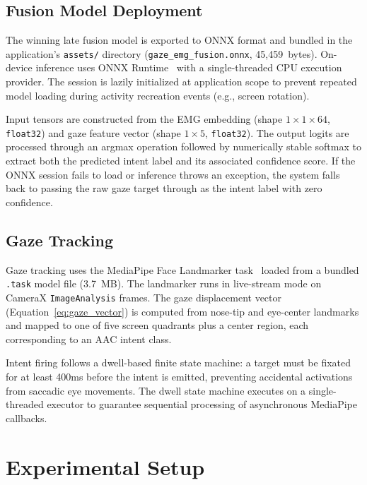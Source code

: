 \documentclass[journal]{IEEEtran}
\begin{document}
\subsection{Fusion Model Deployment}
\label{sec:fusion_deploy}

The winning late fusion model is exported to ONNX format and bundled in the application's \texttt{assets/} directory (\texttt{gaze\_emg\_fusion.onnx}, 45,459~bytes). On-device inference uses ONNX Runtime~\cite{onnxruntime} with a single-threaded CPU execution provider. The session is lazily initialized at application scope to prevent repeated model loading during activity recreation events (e.g., screen rotation).

Input tensors are constructed from the EMG embedding (shape $1 \times 1 \times 64$, \texttt{float32}) and gaze feature vector (shape $1 \times 5$, \texttt{float32}). The output logits are processed through an argmax operation followed by numerically stable softmax to extract both the predicted intent label and its associated confidence score. If the ONNX session fails to load or inference throws an exception, the system falls back to passing the raw gaze target through as the intent label with zero confidence.

\subsection{Gaze Tracking}
\label{sec:gaze_impl}

Gaze tracking uses the MediaPipe Face Landmarker task~\cite{mediapipe} loaded from a bundled \texttt{.task} model file (3.7~MB). The landmarker runs in live-stream mode on CameraX \texttt{ImageAnalysis} frames. The gaze displacement vector (Equation~\ref{eq:gaze_vector}) is computed from nose-tip and eye-center landmarks and mapped to one of five screen quadrants plus a center region, each corresponding to an AAC intent class.

Intent firing follows a dwell-based finite state machine: a target must be fixated for at least 400ms before the intent is emitted, preventing accidental activations from saccadic eye movements. The dwell state machine executes on a single-threaded executor to guarantee sequential processing of asynchronous MediaPipe callbacks.

\section{Experimental Setup}
\label{sec:experiments}
\end{document}
